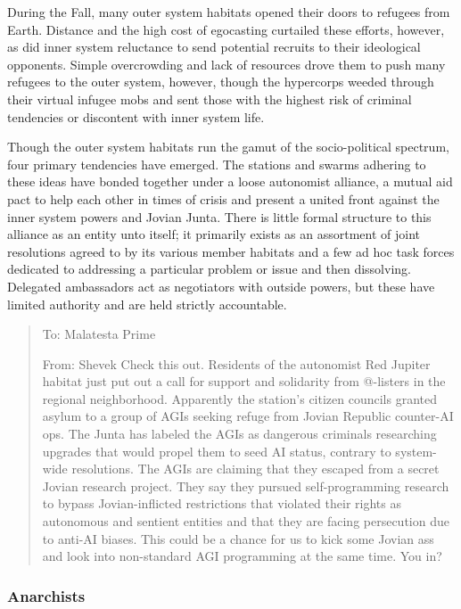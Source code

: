 During the Fall, many outer system habitats opened their doors to refugees from Earth. Distance and the high cost of egocasting curtailed these efforts, however, as did inner system reluctance to send potential recruits to their ideological opponents. Simple overcrowding and lack of resources drove them to push many refugees to the outer system, however, though the hypercorps weeded through their virtual infugee mobs and sent those with the highest risk of criminal tendencies or discontent with inner system life. 

Though the outer system habitats run the gamut of the socio-political spectrum, four primary tendencies have emerged. The stations and swarms adhering to these ideas have bonded together under a loose autonomist alliance, a mutual aid pact to help each other in times of crisis and present a united front against the inner system powers and Jovian Junta. There is little formal structure to this alliance as an entity unto itself; it primarily exists as an assortment of joint resolutions agreed to by its various member habitats and a few ad hoc task forces dedicated to addressing a particular problem or issue and then dissolving. Delegated ambassadors act as negotiators with outside powers, but these have limited authority and are held strictly accountable. 

\begin{quotation}
To: Malatesta Prime 

 From: Shevek  Check this out. Residents of the autonomist Red Jupiter habitat just put out a call for support and solidarity from @-listers in the regional neighborhood. Apparently the station’s citizen councils granted asylum to a group of AGIs seeking refuge from Jovian Republic counter-AI ops. The Junta has labeled the AGIs as dangerous criminals researching upgrades that would propel them to seed AI status, contrary to system-wide resolutions. The AGIs are claiming that they escaped from a secret Jovian research project. They say they pursued self-programming research to bypass Jovian-inflicted restrictions that violated their rights as autonomous and sentient entities and that they are facing persecution due to anti-AI biases. This could be a chance for us to kick some Jovian ass and look into non-standard AGI programming at the same time. You in?
\end{quotation} 

\subsubsection{Anarchists}
\label{sec:anarchists} 

